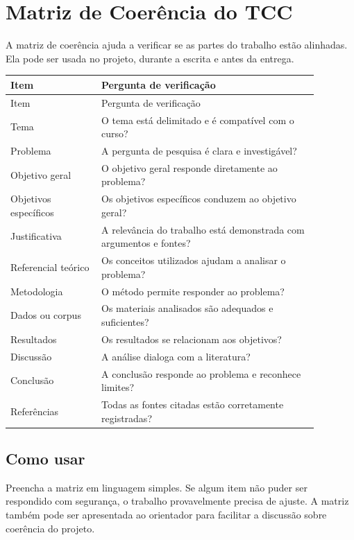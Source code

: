 \chapter{Matriz de Coerência do TCC}

A matriz de coerência ajuda a verificar se as partes do trabalho estão alinhadas. Ela pode ser usada no projeto, durante a escrita e antes da entrega.

\begin{longtable}{p{0.26\linewidth}p{0.62\linewidth}}
\toprule
Item & Pergunta de verificação \\
\midrule
\endfirsthead
\toprule
Item & Pergunta de verificação \\
\midrule
\endhead
Tema & O tema está delimitado e é compatível com o curso? \\
Problema & A pergunta de pesquisa é clara e investigável? \\
Objetivo geral & O objetivo geral responde diretamente ao problema? \\
Objetivos específicos & Os objetivos específicos conduzem ao objetivo geral? \\
Justificativa & A relevância do trabalho está demonstrada com argumentos e fontes? \\
Referencial teórico & Os conceitos utilizados ajudam a analisar o problema? \\
Metodologia & O método permite responder ao problema? \\
Dados ou corpus & Os materiais analisados são adequados e suficientes? \\
Resultados & Os resultados se relacionam aos objetivos? \\
Discussão & A análise dialoga com a literatura? \\
Conclusão & A conclusão responde ao problema e reconhece limites? \\
Referências & Todas as fontes citadas estão corretamente registradas? \\
\bottomrule
\end{longtable}

\section{Como usar}

Preencha a matriz em linguagem simples. Se algum item não puder ser respondido com segurança, o trabalho provavelmente precisa de ajuste. A matriz também pode ser apresentada ao orientador para facilitar a discussão sobre coerência do projeto.


